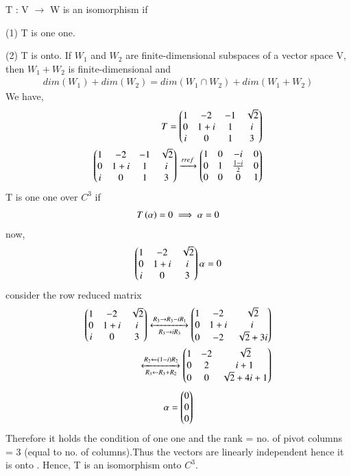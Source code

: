 T : V $\rightarrow$ W is an isomorphism if
 
 (1) T is one one.
 
 (2) T is onto.
If $W_1$ and $W_2$ are finite-dimensional subspaces of a vector space V, then $W_1+W_2$ is finite-dimensional and
\begin{align}
    dim (W_1)+ dim(W_2) = dim(W_1 {\displaystyle \cap } W_2) + dim (W_1 + W_2)\label{eq:solutions/3/3/2/c/eqdim}
\end{align}
We have,
\begin{align}
T=\begin{pmatrix}1&-2&-1&\sqrt{2}\\0&1+i&1&i\\i&0&1&3\end{pmatrix}&\\
\begin{pmatrix}1&-2&-1&\sqrt{2}\\0&1+i&1&i\\i&0&1&3\end{pmatrix}\xrightarrow[]{rref}\begin{pmatrix}1&0&-i&0\\0&1&\frac{1-i}{2}&0\\0&0&0&1\end{pmatrix}\label{eq:solutions/3/3/2/c/rref}
\end{align}
T is one one over $C^{3}$ if 
\begin{align}
    T\left(\alpha\right)=0 \implies \alpha =0
\end{align}
now,
\begin{align}
 \begin{pmatrix}1&-2&\sqrt{2}\\0&1+i&i\\i&0&3\end{pmatrix}\alpha = 0
\end{align}
consider the row reduced matrix
\begin{align}
    \begin{pmatrix}1&-2&\sqrt{2}\\0&1+i&i\\i&0&3\end{pmatrix}
    \xleftrightarrow[R_3\rightarrow i R_3]{R_3\rightarrow R_3-iR_1}\begin{pmatrix}1&-2&\sqrt{2}\\0&1+i&i\\0&-2&\sqrt{2}+3i\end{pmatrix}\\
    \xleftrightarrow[R_3\leftarrow R_3+R_2]{R_2\leftarrow (1-i)R_2}\begin{pmatrix}1&-2&\sqrt{2}\\0&2&i+1\\0&0&\sqrt{2}+4i+1\end{pmatrix}
\end{align}
\begin{align}
    \mathbf{\alpha} = \begin{pmatrix}0\\0\\0\end{pmatrix}
\end{align}
Therefore it holds the condition of one one and the rank = no. of pivot columns = 3 (equal to no. of columns).Thus the  vectors are linearly independent hence it is onto . Hence, T is an isomorphism onto $C^{3}$. \newline
